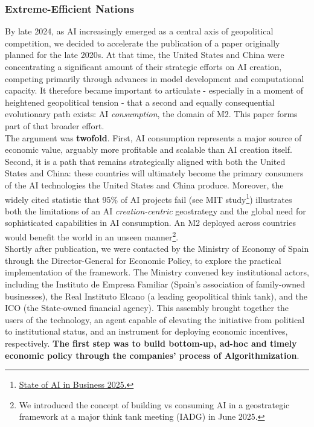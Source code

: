 \documentclass{article}
\begin{document}
\subsubsection{Extreme-Efficient Nations}
\label{subsubsection: Extreme-Efficient Nations}

By late 2024, as AI increasingly emerged as a central axis of geopolitical competition, we decided to accelerate the publication of a paper originally planned for the late 2020s. At that time, the United States and China were concentrating a significant amount of their strategic efforts on AI creation, competing primarily through advances in model development and computational capacity. It therefore became important to articulate - especially in a moment of heightened geopolitical tension - that a second and equally consequential evolutionary path exists: AI \textit{consumption}, the domain of M2. This paper forms part of that broader effort.\\

The argument was \textbf{twofold}. First, AI consumption represents a major source of economic value, arguably more profitable and scalable than AI creation itself. Second, it is a path that remains strategically aligned with both the United States and China: these countries will ultimately become the primary consumers of the AI technologies the United States and China produce. Moreover, the widely cited statistic that 95\% of AI projects fail (see MIT study\footnote{\href{https://mlq.ai/media/quarterly_decks/v0.1_State_of_AI_in_Business_2025_Report.pdf}{State of AI in Business 2025.}}) illustrates both the limitations of an AI \textit{creation-centric} geostrategy and the global need for sophisticated capabilities in AI consumption. An M2 deployed across countries would benefit the world in an unseen manner\footnote{We introduced the concept of building vs consuming AI in a geostrategic framework at a major think tank meeting (IADG) in June 2025.}.\\

Shortly after publication, we were contacted by the Ministry of Economy of Spain through the Director-General for Economic Policy, to explore the practical implementation of the framework. The Ministry convened key institutional actors, including the Instituto de Empresa Familiar (Spain’s association of family-owned businesses), the Real Instituto Elcano (a leading geopolitical think tank), and the ICO (the State-owned financial agency). This assembly brought together the users of the technology, an agent capable of elevating the initiative from political to institutional status, and an instrument for deploying economic incentives, respectively. \textbf{The first step was to build bottom-up, ad-hoc and timely economic policy through the companies’ process of Algorithmization}.\\
\end{document}
